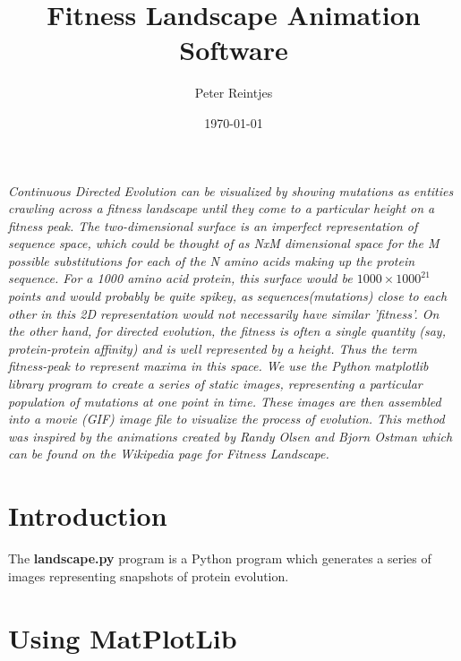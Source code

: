 \documentclass[10pt,letterpaper]{article}
\date{}
\begin{document}
\title{Fitness Landscape Animation Software}
\author{Peter Reintjes}
\date{\today}
\maketitle

\vspace*{0.2in}
\begin{flushleft}
\texttt{[image: \{fitness]}.png}
\end{flushleft}

{\it Continuous Directed Evolution can be visualized by showing mutations as entities crawling across a fitness landscape until they come to a particular height on a fitness peak.  The two-dimensional surface is an imperfect representation of sequence space, which could be thought of as NxM dimensional space for the M possible substitutions for each of the N amino acids making up the protein sequence.  For a 1000 amino acid protein, this surface would be $1000 \times 1000^{21}$ points and would probably be quite spikey, as sequences(mutations) close to each other in this 2D representation would not necessarily have similar 'fitness'.  On the other hand, for directed evolution, the fitness is often a single quantity (say, protein-protein affinity) and is well represented by a height.  Thus the term fitness-peak to represent maxima in this space.  We use the Python matplotlib library\cite{matplotlib} program to create a series of static images, representing a particular population of mutations at one point in time.  These images are then assembled into a movie (GIF) image file to visualize the process of evolution.  This method was inspired by the animations created by Randy Olsen and Bjorn Ostman which can be found on the Wikipedia page for Fitness Landscape\cite{fitness}.}

\section*{Introduction}

The {\bf landscape.py} program is a Python program which generates a series of images representing snapshots of protein evolution.

\section*{Using MatPlotLib}
\end{document}

